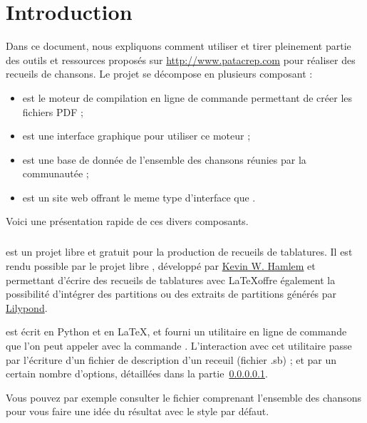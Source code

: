 \chapter*{Introduction}
\minitoc
\label{chap:introduction}

Dans ce document, nous expliquons comment utiliser et tirer pleinement partie des outils et ressources proposés sur \url{http://www.patacrep.com} pour réaliser des recueils de chansons. Le projet \patacrep se décompose en plusieurs composant :
\begin{itemize}
   \item \patacrep est le moteur de compilation en ligne de commande permettant de créer les fichiers PDF ;
   \item \patagui est une interface graphique pour utiliser ce moteur ;
   \item \patadata est une base de donnée de l'ensemble des chansons réunies par la communautée ;
   \item \patawww est un site web offrant le meme type d'interface que \patagui. 
\end{itemize}

Voici une présentation rapide de ces divers composants.

\paragraph{\patacrep}
\patacrep est un projet libre et gratuit pour la production de recueils de tablatures. Il est rendu possible par le projet libre \songs, développé par \href{http://www.utdallas.edu/~hamlen}{Kevin W. Hamlem} et permettant d'écrire des recueils de tablatures avec \LaTeX\. \patacrep offre également la possibilité d'intégrer des partitions ou des extraits de partitions générés par \href{http://lilypond.org}{Lilypond}.

\patacrep est écrit en Python et en LaTeX, et fourni un utilitaire en ligne de commande que l'on peut appeler avec la commande . L'interaction avec cet utilitaire passe par l'écriture d'un fichier de description d'un receuil (fichier .sb) ; et par un certain nombre d'options, détaillées dans la partie~\ref{}.

Vous pouvez par exemple consulter le fichier \href{http://www.patacrep.com/data/documents/songbook.pdf}{} comprenant l'ensemble des chansons pour vous faire une idée du résultat avec le style par défaut.

